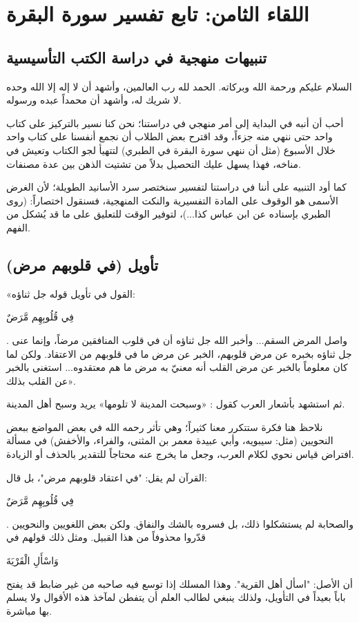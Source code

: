 \chapter{اللقاء الثامن: تابع تفسير سورة البقرة}

\section{تنبيهات منهجية في دراسة الكتب التأسيسية}
السلام عليكم ورحمة الله وبركاته. الحمد لله رب العالمين، وأشهد أن لا إله إلا الله وحده لا شريك له، وأشهد أن محمداً عبده ورسوله. 

أحب أن أنبه في البداية إلى أمر منهجي في دراستنا؛ نحن كنا نسير بالتركيز على كتاب واحد حتى ننهي منه جزءاً، وقد اقترح بعض الطلاب أن نجمع أنفسنا على كتاب واحد خلال الأسبوع (مثل أن ننهي سورة البقرة في الطبري) لتتهيأ لجو الكتاب وتعيش في مناخه، فهذا يسهل عليك التحصيل بدلاً من تشتيت الذهن بين عدة مصنفات.

كما أود التنبيه على أننا في دراستنا لتفسير  سنختصر سرد الأسانيد الطويلة؛ لأن الغرض الأسمى هو الوقوف على المادة التفسيرية والنكت المنهجية، فسنقول اختصاراً: (روى الطبري بإسناده عن ابن عباس كذا...)، لتوفير الوقت للتعليق على ما قد يُشكل من الفهم.

\separator

\section{تأويل (في قلوبهم مرض)}
 «القول في تأويل قوله جل ثناؤه: \begin{ayah}فِي قُلُوبِهِم مَّرَضٌ\end{ayah}. واصل المرض السقم... وأخبر الله جل ثناؤه أن في قلوب المنافقين مرضاً، وإنما عنى جل ثناؤه بخبره عن مرض قلوبهم، الخبر عن مرض ما في قلوبهم من الاعتقاد. ولكن لما كان معلوماً بالخبر عن مرض القلب أنه معنيّ به مرض ما هم معتقدوه... استغنى بالخبر عن القلب بذلك».

ثم استشهد  بأشعار العرب كقول : «وسبحت المدينة لا تلومها» يريد وسبح أهل المدينة.

\begin{fawaid}
نلاحظ هنا فكرة ستتكرر معنا كثيراً؛ وهي تأثر  رحمه الله في بعض المواضع ببعض النحويين (مثل: سيبويه، وأبي عبيدة معمر بن المثنى، والفراء، والأخفش) في مسألة افتراض قياس نحوي لكلام العرب، وجعل ما يخرج عنه محتاجاً للتقدير بالحذف أو الزيادة.

القرآن لم يقل: "في اعتقاد قلوبهم مرض"، بل قال: \begin{ayah}فِي قُلُوبِهِم مَّرَضٌ\end{ayah}. والصحابة لم يستشكلوا ذلك، بل فسروه بالشك والنفاق. ولكن بعض اللغويين والنحويين قدّروا محذوفاً من هذا القبيل. ومثل ذلك قولهم في \begin{ayah}وَاسْأَلِ الْقَرْيَةَ\end{ayah} أن الأصل: "اسأل أهل القرية". وهذا المسلك إذا توسع فيه صاحبه من غير ضابط قد يفتح باباً بعيداً في التأويل، ولذلك ينبغي لطالب العلم أن يتفطن لمآخذ هذه الأقوال ولا يسلم بها مباشرة.
\end{fawaid}

